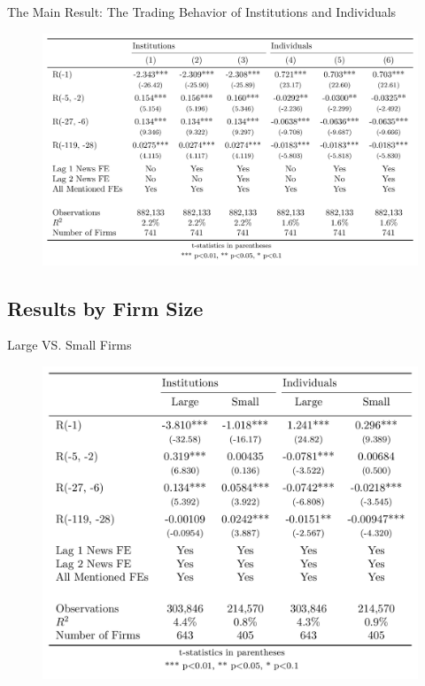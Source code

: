 \documentclass{beamer}
\begin{document}
\begin{frame}{}
    \begin{block}{The Main Result: The Trading Behavior of Institutions and Individuals}
        \begin{figure}
            \includegraphics[width=\textwidth]{v5.png}
        \end{figure}
    \end{block}
\end{frame}


\subsection{Results by Firm Size}

\begin{frame}{Large VS. Small Firms}
    \begin{figure}
        \includegraphics[scale = .2]{size.png}
    \end{figure}
\end{frame}
\end{document}

